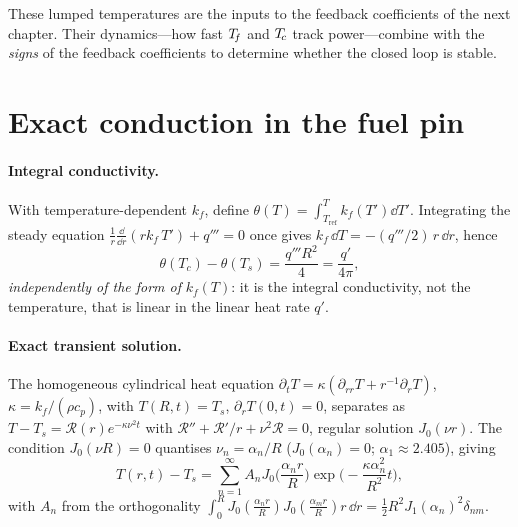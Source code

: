 These lumped temperatures are the inputs to the feedback coefficients of the next
chapter. Their dynamics---how fast $T_{\!f}$ and $T_{\!c}$ track power---combine with the
\emph{signs} of the feedback coefficients to determine whether the closed loop is
stable.



\section{Exact conduction in the fuel pin}
\label{sec:fuel-conduction}

\paragraph{Integral conductivity.}
With temperature-dependent $k_f$, define $\theta(T)=\int_{T_{\mathrm{ref}}}^{T}
k_f(T')\dd T'$. Integrating the steady equation
$\frac1r\frac{\dd}{\dd r}(r k_f\,T')+q'''=0$ once gives
$k_f\,\dd T=-(q'''/2)\,r\,\dd r$, hence
\begin{equation}
\theta(T_c)-\theta(T_s)=\frac{q''' R^2}{4}=\frac{q'}{4\pi},
\label{eq:integral-cond}
\end{equation}
\emph{independently of the form of} $k_f(T)$: it is the integral conductivity, not
the temperature, that is linear in the linear heat rate $q'$.

\paragraph{Exact transient solution.}
The homogeneous cylindrical heat equation
$\partial_t T=\kappa(\partial_{rr}T+r^{-1}\partial_r T)$, $\kappa=k_f/(\rho c_p)$,
with $T(R,t)=T_s$, $\partial_rT(0,t)=0$, separates as $T-T_s=\mathcal R(r)e^{-\kappa\nu^2t}$
with $\mathcal R''+\mathcal R'/r+\nu^2\mathcal R=0$, regular solution $J_0(\nu r)$.
The condition $J_0(\nu R)=0$ quantises $\nu_n=\alpha_n/R$ ($J_0(\alpha_n)=0$;
$\alpha_1\approx2.405$), giving
\begin{equation}
T(r,t)-T_s=\sum_{n=1}^{\infty}A_n J_0\!\Big(\frac{\alpha_n r}{R}\Big)
\exp\!\Big(-\frac{\kappa\alpha_n^2}{R^2}t\Big),
\label{eq:bessel-series}
\end{equation}
with $A_n$ from the orthogonality
$\int_0^R J_0(\tfrac{\alpha_n r}{R})J_0(\tfrac{\alpha_m r}{R})r\,\dd r
=\tfrac12 R^2 J_1(\alpha_n)^2\delta_{nm}$.

